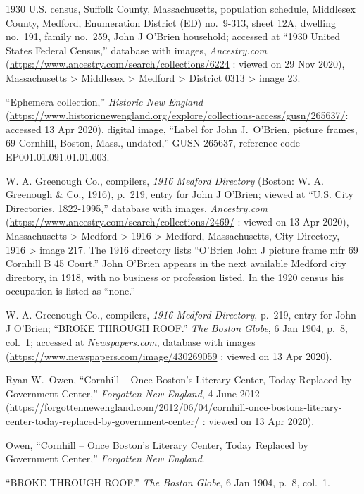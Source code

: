 \begin{thebibliography}{999}
1930 U.S. census, Suffolk County, Massachusetts, population schedule, Middlesex County, Medford, Enumeration District (ED) no.\ 9-313, sheet 12A, dwelling no.\ 191, family no.\ 259, John J O'Brien household; accessed at ``1930 United States Federal Census,'' database with images, \textit{Ancestry.com} (\url{https://www.ancestry.com/search/collections/6224} : viewed on 29 Nov 2020), Massachusetts > Middlesex > Medford > District 0313 > image 23.

``Ephemera collection,'' \textit{Historic New England} (\url{https://www.historicnewengland.org/explore/collections-access/gusn/265637/}: accessed 13 Apr 2020), digital image, ``Label for John J.\ O'Brien, picture frames, 69 Cornhill, Boston, Mass., undated,'' GUSN-265637, reference code EP001.01.091.01.01.003.

W. A. Greenough Co., compilers, \textit{1916 Medford Directory} (Boston: W. A. Greenough \& Co., 1916), p.\ 219, entry for John J O'Brien; viewed at ``U.S. City Directories, 1822-1995,'' database with images, \textit{Ancestry.com} (\url{https://www.ancestry.com/search/collections/2469/} : viewed on 13 Apr 2020), Massachusetts > Medford > 1916 > Medford, Massachusetts, City Directory, 1916 > image 217.
The 1916 directory lists ``O'Brien John J picture frame mfr 69 Cornhill B 45 Court.'' John O'Brien appears in the next available Medford city directory, in 1918, with no business or profession listed. In the 1920 census his occupation is listed as ``none.''

W. A. Greenough Co., compilers, \textit{1916 Medford Directory}, p.\ 219, entry for John J O'Brien; ``BROKE THROUGH ROOF.'' \textit{The Boston Globe}, 6 Jan 1904, p.\ 8, col.\ 1; accessed at \textit{Newspapers.com}, database with images (\url{https://www.newspapers.com/image/430269059} : viewed on 13 Apr 2020).

Ryan W.\ Owen, ``Cornhill -- Once Boston’s Literary Center, Today Replaced by Government Center,'' \textit{Forgotten New England}, 4 June 2012 (\url{https://forgottennewengland.com/2012/06/04/cornhill-once-bostons-literary-center-today-replaced-by-government-center/} : viewed on 13 Apr 2020).

Owen, ``Cornhill -- Once Boston’s Literary Center, Today Replaced by Government Center,'' \textit{Forgotten New England}.

``BROKE THROUGH ROOF.'' \textit{The Boston Globe}, 6 Jan 1904, p.\ 8, col.\ 1.


\end{thebibliography}
